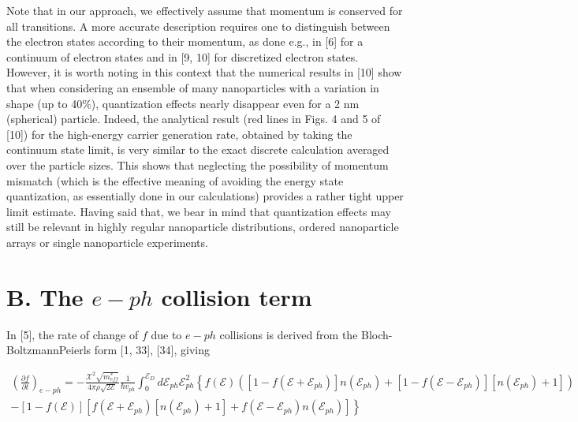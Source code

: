 \documentclass[10pt]{article}
\begin{document}
Note that in our approach, we effectively assume that momentum is conserved for all transitions. A more accurate description requires one to distinguish between the electron states according to their momentum, as done e.g., in [6] for a continuum of electron states and in [9, 10] for discretized electron states. However, it is worth noting in this context that the numerical results in [10] show that when considering an ensemble of many nanoparticles with a variation in shape (up to 40\%), quantization effects nearly disappear even for a 2 nm (spherical) particle. Indeed, the analytical result (red lines in Figs. 4 and 5 of [10]) for the high-energy carrier generation rate, obtained by taking the continuum state limit, is very similar to the exact discrete calculation averaged over the particle sizes. This shows that neglecting the possibility of momentum mismatch (which is the effective meaning of avoiding the energy state quantization, as essentially done in our calculations) provides a rather tight upper limit estimate. Having said that, we bear in mind that quantization effects may still be relevant in highly regular nanoparticle distributions, ordered nanoparticle arrays or single nanoparticle experiments.

\section*{B. The $e-p h$ collision term}
In [5], the rate of change of $f$ due to $e-p h$ collisions is derived from the Bloch-BoltzmannPeierls form [1, 33], [34], giving


\begin{gather*}
\left(\frac{\partial f}{\partial t}\right)_{e-p h}=-\frac{\mathcal{X}^{2} \sqrt{m_{e f f}^{*}}}{4 \pi \rho \sqrt{2 \mathcal{E}}} \frac{1}{\hbar v_{p h}} \int_{0}^{\mathcal{E}_{D}} d \mathcal{E}_{p h} \mathcal{E}_{p h}^{2}\left\{f(\mathcal{E})\left(\left[1-f\left(\mathcal{E}+\mathcal{E}_{p h}\right)\right] n\left(\mathcal{E}_{p h}\right)+\left[1-f\left(\mathcal{E}-\mathcal{E}_{p h}\right)\right]\left[n\left(\mathcal{E}_{p h}\right)+1\right]\right)\right. \\
\left.-[1-f(\mathcal{E})]\left[f\left(\mathcal{E}+\mathcal{E}_{p h}\right)\left[n\left(\mathcal{E}_{p h}\right)+1\right]+f\left(\mathcal{E}-\mathcal{E}_{p h}\right) n\left(\mathcal{E}_{p h}\right)\right]\right\} \tag{S10}
\end{gather*}
\end{document}

